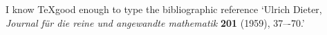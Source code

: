 I know \TeX good enough to type the bibliographic reference `Ulrich Dieter,
{\sl Journal f\"ur die reine und angewandte mathematik\/}
{\bf201} (1959), 37–-70.'
\bye
